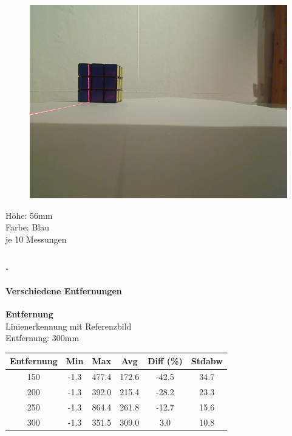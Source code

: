\documentclass[xcolor=dvipsnames]{beamer}
\def\frametitlesec{\frametitle{\arabic{section}.\hspace{0.5ex}\insertsection}}
\def\framesubtitles#1{\framesubtitle{\hspace{3.5ex}#1}}
\begin{document}
\begin{frame}[noframenumbering]
\begin{figure}
\begin{minipage}{0.32\linewidth}
		\end{minipage}
		\hfill
		\begin{minipage}{0.32\linewidth}
			\includegraphics[width=\linewidth]{includes/test_dist_3}
		\end{minipage}
	\end{figure}
	Höhe: 56mm\\
	Farbe: Blau\\
	je 10 Messungen
	
\end{frame}

\begin{frame}[noframenumbering]
	\frametitlesec
	\framesubtitles{Verschiedene Entfernungen}
		\textbf{Entfernung}\\
		
		Linienerkennung mit Referenzbild\\
		Entfernung: 300mm
		
		\begin{tabular}{c|c|c|c|c|c}
			Entfernung & Min & Max & Avg & Diff (\%) & Stdabw\\ \hline
150 &      -1.3 & 477.4 & 172.6 & -42.5 & 34.7\\
200 &      -1.3 & 392.0 & 215.4 & -28.2 & 23.3\\
250 &      -1.3 & 864.4 & 261.8 & -12.7 & 15.6\\
300 &      -1.3 & 351.5 & 309.0 & 3.0 & 10.8\\

		\end{tabular}
		
		
\end{frame}
\end{document}
